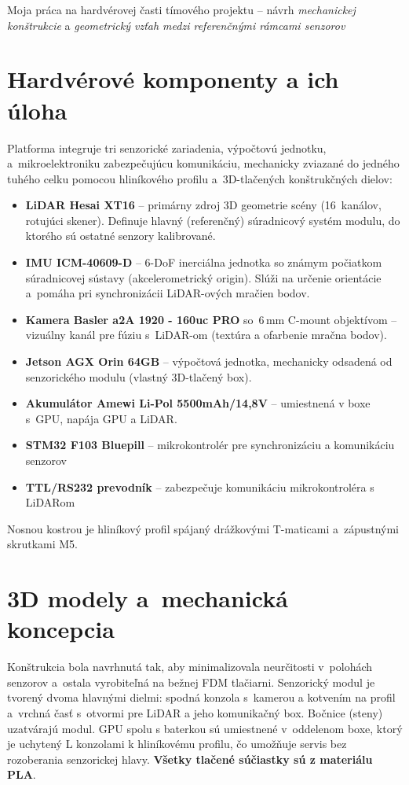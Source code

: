 Moja práca na hardvérovej časti tímového projektu -- návrh
\textit{mechanickej konštrukcie} a \textit{geometrický vzťah medzi
referenčnými rámcami senzorov}

\section{Hardvérové komponenty a ich úloha}
Platforma integruje tri senzorické zariadenia, výpočtovú jednotku, a~mikroelektroniku
zabezpečujúcu komunikáciu, mechanicky zviazané do
jedného tuhého celku pomocou hliníkového profilu a~3D-tlačených konštrukčných dielov:

\begin{itemize}
  \item \textbf{LiDAR Hesai XT16} -- primárny zdroj 3D geometrie scény (16~kanálov,
        rotujúci skener). Definuje hlavný (referenčný) súradnicový systém modulu, do
        ktorého sú ostatné senzory kalibrované.
  \item \textbf{IMU ICM-40609-D} -- 6-DoF inerciálna jednotka so známym počiatkom súradnicovej sústavy
        (akcelerometrický origin). Slúži na určenie orientácie a~pomáha pri
        synchronizácii LiDAR-ových mračien bodov.
  \item \textbf{Kamera Basler a2A 1920 - 160uc PRO} so~6\,mm C-mount objektívom -- vizuálny kanál
        pre fúziu s~LiDAR-om (textúra a ofarbenie mračna bodov).
  \item \textbf{Jetson AGX Orin 64GB} -- výpočtová jednotka, mechanicky odsadená od
        senzorického modulu (vlastný 3D-tlačený box).
  \item \textbf{Akumulátor Amewi Li-Pol 5500mAh/14,8V} -- umiestnená v boxe s~GPU, napája GPU a LiDAR.
  \item \textbf{STM32 F103 Bluepill} -- mikrokontrolér pre synchronizáciu a komunikáciu senzorov
  \item \textbf{TTL/RS232 prevodník} -- zabezpečuje komunikáciu mikrokontroléra s LiDARom

\end{itemize}

Nosnou kostrou je hliníkový profil spájaný drážkovými T-maticami a~zápustnými skrutkami M5.

\section{3D modely a~mechanická koncepcia}
Konštrukcia bola navrhnutá tak, aby minimalizovala neurčitosti v~polohách senzorov
a~ostala vyrobiteľná na bežnej FDM tlačiarni. Senzorický modul je tvorený dvoma hlavnými dielmi:
spodná konzola s~kamerou a kotvením na profil a~vrchná časť s~otvormi pre LiDAR a jeho komunikačný box.
Bočnice (steny) uzatvárajú modul. GPU spolu s baterkou sú umiestnené v~oddelenom
boxe, ktorý je uchytený L konzolami k hliníkovému profilu, čo umožňuje
servis bez rozoberania senzorickej hlavy. \textbf{Všetky tlačené súčiastky sú z materiálu PLA}.

